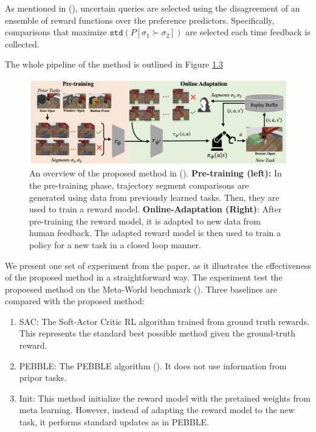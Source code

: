 \documentclass[
  letterpaper,
  DIV=11,
  numbers=noendperiod,
  oneside]{scrreprt}
\theoremstyle{remark}
\begin{document}
As mentioned in (), uncertain queries are selected using the disagreement of an
ensemble of reward functions over the preference predictors.
Specifically, comparisons that maximize
\(\texttt{std}(P[\sigma_1 \succ \sigma_2])\) are selected each time
feedback is collected.

The whole pipeline of the method is outlined in Figure
\hyperref[fig:few-1]{1.3}

\begin{figure}

{\centering \includegraphics{Figures/overview-few.png}

}

\caption{An overview of the proposed method in
().
\textbf{Pre-training (left):} In the pre-training phase, trajectory
segment comparisons are generated using data from previously learned
tasks. Then, they are used to train a reward model.
\textbf{Online-Adaptation (Right)}: After pre-training the reward model,
it is adapted to new data from human feedback. The adapted reward model
is then used to train a policy for a new task in a closed loop manner.}

\end{figure}%

We present one set of experiment from the paper, as it illustrates the
effectiveness of the proposed method in a straightforward way. The
experiment test the propoesed method on the Meta-World benchmark
(). Three baselines are
compared with the proposed method:

\begin{enumerate}
\def\labelenumi{\arabic{enumi}.}
\item
  SAC: The Soft-Actor Critic RL algorithm trained from ground truth
  rewards. This represents the standard best possible method given the
  ground-truth reward.
\item
  PEBBLE: The PEBBLE algorithm (). It does not use information from pripor tasks.
\item
  Init: This method initialize the reward model with the pretained
  weights from meta learning. However, instead of adapting the reward
  model to the new task, it performs standard updates as in PEBBLE.
\end{enumerate}
\end{document}
